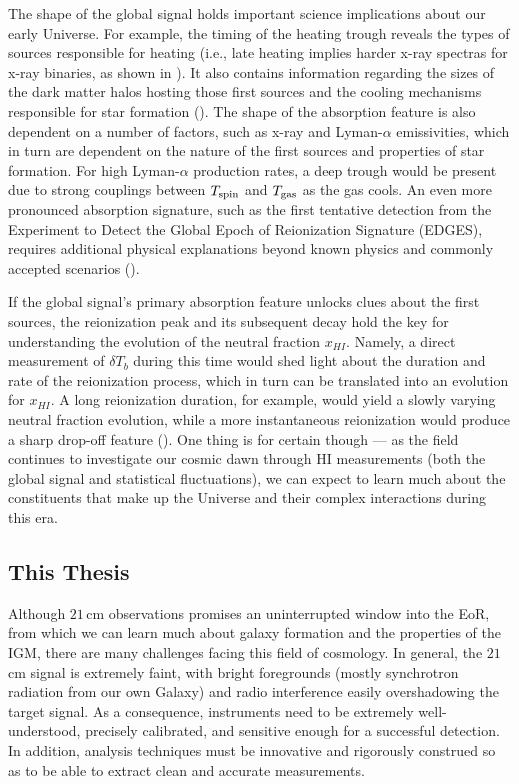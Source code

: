 The shape of the global signal holds important science implications about our early Universe. For example, the timing of the heating trough reveals the types of sources responsible for heating (i.e., late heating implies harder x-ray spectras for x-ray binaries, as shown in \citet{fialkov_et_al2014}). It also contains information regarding the sizes of the dark matter halos hosting those first sources and the cooling mechanisms responsible for star formation (\citealt{fialkov_et_al2014b}). The shape of the absorption feature is also dependent on a number of factors, such as x-ray and Lyman-$\alpha$ emissivities, which in turn are dependent on the nature of the first sources and properties of star formation. For high Lyman-$\alpha$ production rates, a deep trough would be present due to strong couplings between $T_{\rm spin}$ and $T_{\rm gas}$ as the gas cools. An even more pronounced absorption signature, such as the first tentative detection from the Experiment to Detect the Global Epoch of Reionization Signature (EDGES), requires additional physical explanations beyond known physics and commonly accepted scenarios (\citealt{bowman_et_al2018}). 

If the global signal's primary absorption feature unlocks clues about the first sources, the reionization peak and its subsequent decay hold the key for understanding the evolution of the neutral fraction $x_{HI}$. Namely, a direct measurement of $\delta T_{b}$ during this time would shed light about the duration and rate of the reionization process, which in turn can be translated into an evolution for $x_{HI}$. A long reionization duration, for example, would yield a slowly varying neutral fraction evolution, while a more instantaneous reionization would produce a sharp drop-off feature (\citealt{pritchard_and_loeb2010}). One thing is for certain though --- as the field continues to investigate our cosmic dawn through HI measurements (both the global signal and statistical fluctuations), we can expect to learn much about the constituents that make up the Universe and their complex interactions during this era.

\subsection{This Thesis}

Although $21$\,cm observations promises an uninterrupted window into the EoR, from which we can learn much about galaxy formation and the properties of the IGM, there are many challenges facing this field of cosmology. In general, the $21$\,cm signal is extremely faint, with bright foregrounds (mostly synchrotron radiation from our own Galaxy) and radio interference easily overshadowing the target signal. As a consequence, instruments need to be extremely well-understood, precisely calibrated, and sensitive enough for a successful detection. In addition, analysis techniques must be innovative and rigorously construed so as to be able to extract clean and accurate measurements.

